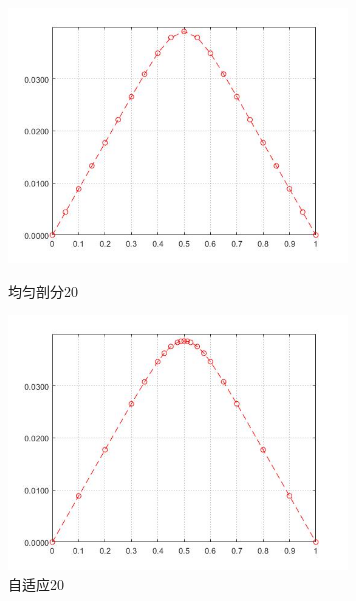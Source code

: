 \documentclass[12pt,fontset=mac]{ctexart}
\begin{document}
\begin{figure}[H]
	\centering
	\begin{minipage}[t]{0.48\textwidth}
		\centering
		\includegraphics[width=9cm]{方程二，均匀剖分20.jpg}
		\caption{均匀剖分20}
	\end{minipage}
	\begin{minipage}[t]{0.48\textwidth}
		\centering
		\includegraphics[width=9cm]{方程二，自适应20.jpg}
		\caption{自适应20}
	\end{minipage}
\end{figure}
\end{document}
